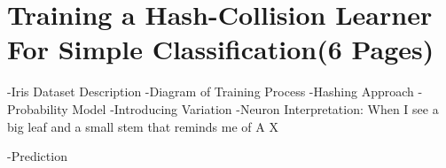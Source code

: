 \chapter{Training a Hash-Collision Learner For Simple Classification(6 Pages)}

-Iris Dataset Description
-Diagram of Training Process
-Hashing Approach
-Probability Model
-Introducing Variation
-Neuron Interpretation:
When I see a big leaf and a small stem that reminds me of A X

-Prediction